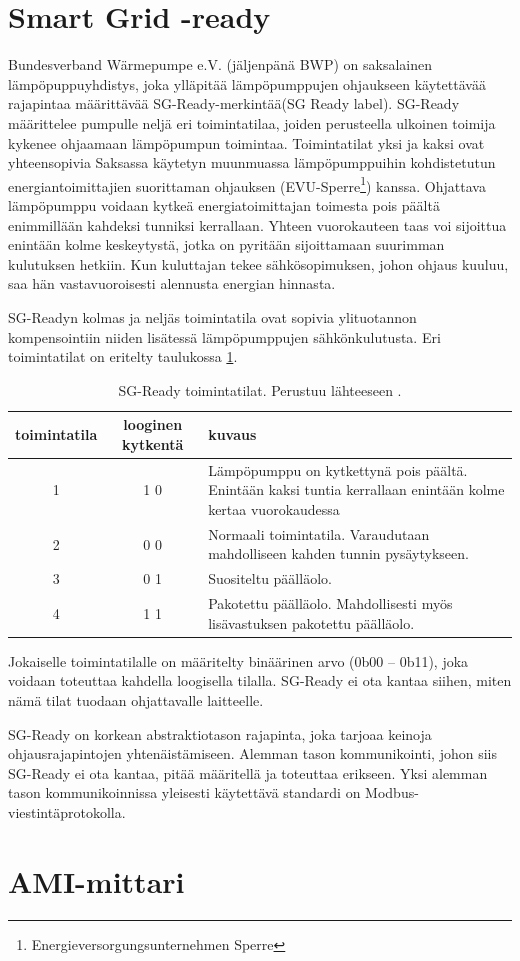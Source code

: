 \section{Smart Grid -ready}

  Bundesverband Wärmepumpe e.V. (jäljenpänä BWP) on saksalainen lämpöpuppuyhdistys, joka ylläpitää lämpöpumppujen ohjaukseen käytettävää rajapintaa määrittävää \gls{SG}-Ready-merkintää(\gls{SG} Ready label). \gls{SG}-Ready määrittelee pumpulle neljä eri toimintatilaa, joiden perusteella ulkoinen toimija kykenee ohjaamaan lämpöpumpun toimintaa. Toimintatilat yksi ja kaksi ovat yhteensopivia Saksassa käytetyn muunmuassa lämpöpumppuihin kohdistetutun energiantoimittajien suorittaman ohjauksen (EVU-Sperre\footnote{Energieversorgungsunternehmen Sperre}) kanssa.\parencite{SGReadyReg} Ohjattava lämpöpumppu voidaan kytkeä energiatoimittajan toimesta pois päältä enimmillään kahdeksi tunniksi kerrallaan. Yhteen vuorokauteen taas voi sijoittua enintään kolme keskeytystä, jotka on pyritään sijoittamaan suurimman kulutuksen hetkiin. Kun kuluttajan tekee sähkösopimuksen, johon ohjaus kuuluu, saa hän vastavuoroisesti alennusta energian hinnasta.\parencite{enwg, VDEARN4100}

  SG-Readyn  kolmas ja neljäs toimintatila ovat sopivia ylituotannon kompensointiin niiden lisätessä lämpöpumppujen sähkönkulutusta. Eri toimintatilat on eritelty taulukossa \ref{sgready}.
  \begin{table}[h]
    \centering
    \caption[\gls{SG}-Ready toimintatilat]{\gls{SG}-Ready toimintatilat. Perustuu lähteeseen \parencite{SGReadyReg}.}
    \begin{tabular}{|c|c|p{3in}|}
      \hline
      \rowcolor{lightgray} toimintatila & looginen kytkentä & kuvaus \\\hline
      1 & 1 0 & Lämpöpumppu on kytkettynä pois päältä. Enintään kaksi tuntia kerrallaan enintään kolme kertaa vuorokaudessa \\\hline
      2 & 0 0 & Normaali toimintatila. Varaudutaan mahdolliseen kahden tunnin pysäytykseen. \\\hline
      3 & 0 1 & Suositeltu päälläolo. \\ \hline
      4 & 1 1 & Pakotettu päälläolo. Mahdollisesti myös lisävastuksen pakotettu päälläolo. \\\hline
    \end{tabular}
    \label{sgready}
  \end{table}
  Jokaiselle toimintatilalle on määritelty binäärinen arvo (0b00 -- 0b11), joka voidaan toteuttaa kahdella loogisella tilalla. SG-Ready ei ota kantaa siihen, miten nämä tilat tuodaan ohjattavalle laitteelle.\parencite{SGReadyReg}

  SG-Ready on korkean abstraktiotason rajapinta, joka tarjoaa keinoja ohjausrajapintojen yhtenäistämiseen. Alemman tason kommunikointi, johon siis SG-Ready ei ota kantaa, pitää määritellä ja toteuttaa erikseen. Yksi alemman tason kommunikoinnissa yleisesti käytettävä standardi on Modbus-viestintäprotokolla.

\section{AMI-mittari}
  
